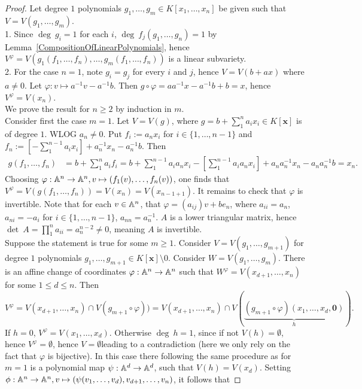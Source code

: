 \begin{proof}
    Let degree $1$ polynomials $g_1,\dots,g_m\in K[x_1,\dots,x_n]$ be given such that $V=V(g_1,\dots,g_m)$.\\   
    1. Since $\deg \ g_i = 1$ for each $i$, $\deg \ f_j(g_1,\dots,g_n) = 1$ by Lemma~\ref{CompositionOfLinearPolynomials}, hence $V^\varphi = V(g_1(f_1,\dots,f_n),\dots,g_m(f_1,\dots,f_n))$ is a linear subvariety.\\
    2. For the case $n=1$, note $g_i=g_j$ for every $i$ and $j$, hence $V=V(b+ax)$ where $a\neq 0$. Let $\varphi: v\mapsto a^{-1}v-a^{-1}b$. Then $g\circ \varphi = aa^{-1}x-a^{-1}b+b=x$, hence $V^\varphi = V(x_n)$.\\
    We prove the result for $n\geq 2$ by induction in $m$.\\
    Consider first the case $m=1$. Let $V=V(g)$, where $g = b+\sum_1^n a_ix_i\in K[\mathbf{x}]$ is of degree $1$. WLOG $a_n\neq 0$. Put $f_i := a_nx_i$ for $i\in\{1,\dots,n-1\}$ and $f_n := \left[-\sum_1^{n-1} a_ix_i \right]+a_n^{-1}x_n-a_n^{-1}b$. Then 
    \begin{align*}
        g(f_1,\dots,f_n)&=b+\sum_1^n a_if_i = b + \sum_1^{n-1} a_ia_nx_i -\left[\sum_1^{n-1}a_ia_nx_i\right]+a_na_n^{-1}x_n-a_na_n^{-1}b = x_n.
    \end{align*}
    Choosing $\varphi: \mathbb{A}^n\rightarrow \mathbb{A}^n, v\mapsto (f_1(v),\dots,f_n(v))$, one finds that $V^\varphi = V(g(f_1,\dots,f_n))=V(x_n)=V(x_{n-1+1})$. It remains to check that $\varphi$ is invertible. Note that for each $v\in\mathbb{A}^n$, that $\varphi = (a_{ij})v+be_n$, where $a_{ii}=a_n$, $a_{ni} = -a_i$ for $i\in\{1,\dots,n-1\}$, $a_{nn}=a_n^{-1}$. $A$ is a lower triangular matrix, hence $\det \ A = \prod_1^n a_{ii}= a_n^{n-2}\neq 0$, meaning $A$ is invertible.\\
    Suppose the statement is true for some $m\geq 1$. Consider $V=V(g_1,\dots,g_{m+1})$ for degree $1$ polynomials $g_1,\dots,g_{m+1}\in K[\mathbf{x}]\setminus 0$. Consider $W= V(g_1,\dots,g_m)$. There is an affine change of coordinates $\varphi: \mathbb{A}^n \rightarrow \mathbb{A}^n$ such that $W^\varphi = V(x_{d+1},\dots,x_n)$ for some $1\leq d\leq n$. Then 
    $$V^\varphi = V(x_{d+1},\dots,x_n)\cap V(g_{m+1}\circ \varphi)) = V(x_{d+1},\dots,x_n)\cap V(\underbrace{(g_{m+1}\circ \varphi)(x_1,\dots,x_d,\mathbf{0})}_{h}).$$
    If $h = 0$, $V^\varphi = V(x_1,\dots,x_d)$. Otherwise $\deg\ h = 1$, since if not $V(h)=\emptyset$, hence $V^\varphi =\emptyset$, hence $V=\emptyset$leading to a contradiction (here we only rely on the fact that $\varphi$ is bijective). In this case there following the same procedure as for $m=1$ is a polynomial map $\psi: \mathbb{A}^d \rightarrow \mathbb{A}^d$, such that $V(h) =V(x_d)$. Setting $\phi: \mathbb{A}^n\rightarrow \mathbb{A}^n, v\mapsto (\psi(v_1,\dots,v_d),v_{d+1},\dots,v_n)$, it follows that 

\end{proof}
